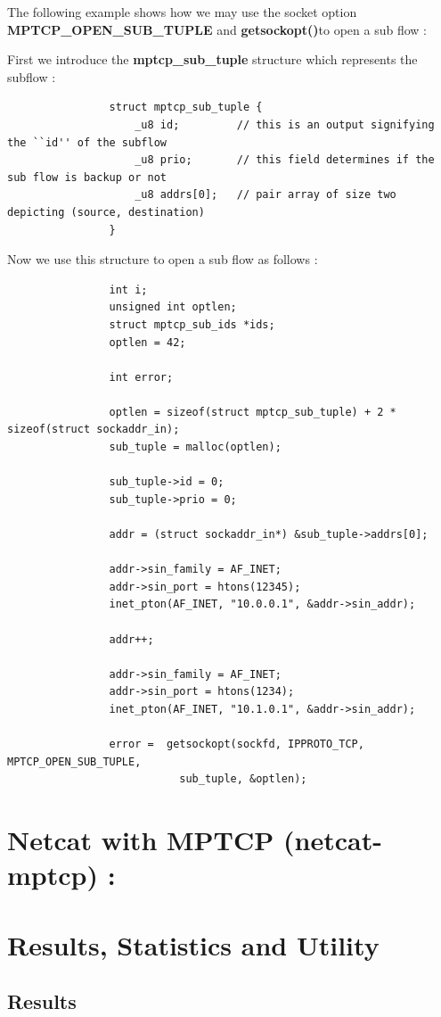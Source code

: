 \documentclass[a4paper,11pt]{article}
\begin{document}
			\raggedright{The following example shows how we may use the socket option \textbf{MPTCP\_OPEN\_SUB\_TUPLE} and \textbf{getsockopt()}to open a sub flow :}

			First we introduce the \textbf{mptcp\_sub\_tuple} structure which represents the subflow :
			\begin{lstlisting}
				struct mptcp_sub_tuple {
					_u8 id;			// this is an output signifying the ``id'' of the subflow
					_u8 prio;		// this field determines if the sub flow is backup or not
					_u8 addrs[0];	// pair array of size two depicting (source, destination)
				}
			\end{lstlisting}
			Now we use this structure to open a sub flow as follows :
			\begin{lstlisting}
				int i;
	   			unsigned int optlen;
	   			struct mptcp_sub_ids *ids;
	   			optlen = 42;

	   			int error;

	   			optlen = sizeof(struct mptcp_sub_tuple) + 2 * sizeof(struct sockaddr_in);
	   			sub_tuple = malloc(optlen);

	   			sub_tuple->id = 0;
	   			sub_tuple->prio = 0;

	   			addr = (struct sockaddr_in*) &sub_tuple->addrs[0];

	   			addr->sin_family = AF_INET;
	   			addr->sin_port = htons(12345);
	   			inet_pton(AF_INET, "10.0.0.1", &addr->sin_addr);

	   			addr++;

	   			addr->sin_family = AF_INET;
	   			addr->sin_port = htons(1234);
	   			inet_pton(AF_INET, "10.1.0.1", &addr->sin_addr);

	   			error =  getsockopt(sockfd, IPPROTO_TCP, MPTCP_OPEN_SUB_TUPLE,
	                       sub_tuple, &optlen);
			\end{lstlisting}

	\clearpage
	\section{Netcat with MPTCP (netcat-mptcp) :}

		\label{sec:netcat-mptcp}
			
	\clearpage
	\section{Results, Statistics and Utility}
		\label{sec:res}
		\subsection{Results}
			\label{subsec:result}
\end{document}
